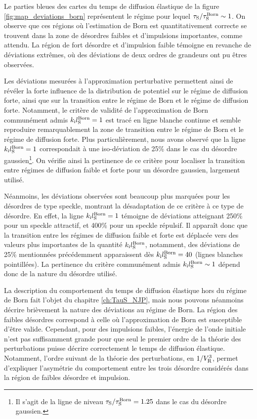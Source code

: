 Le parties bleues des cartes du temps de diffusion élastique de la figure \ref{fig:map_deviations_born} représentent le régime pour lequel $\tau_{\mathrm{S}}/\tau_{\mathrm{S}}^{\mathrm{Born}}\sim 1$. On observe que ces régions où l'estimation de Born est quantitativement correcte se trouvent dans la zone de désordres faibles et d'impulsions importantes, comme attendu. La région de fort désordre et d'impulsion faible témoigne en revanche de déviations extrêmes, où des déviations de deux ordres de grandeurs ont pu êtres observées.

Les déviations mesurées à l'approximation perturbative permettent ainsi de révéler la forte influence de la distribution de potentiel sur le régime de diffusion forte, ainsi que sur la transition entre le régime de Born et le régime de diffusion forte. Notamment, le critère de validité de l'approximation de Born communément admis $k_{\mathrm{i}}l_{\mathrm{S}}^{\mathrm{Born}}=1$ est tracé en ligne blanche continue et semble reproduire remarquablement la zone de transition entre le régime de Born et le régime de diffusion forte. Plus particulièrement, nous avons observé que la ligne $k_{\mathrm{i}}l_{\mathrm{S}}^{\mathrm{Born}}=1$ correspondait à une iso-déviation de 25\% dans le cas du désordre gaussien\footnote{Il s'agit de la ligne de niveau $\tau_{\mathrm{S}}/\tau_{\mathrm{S}}^{\mathrm{Born}}=1.25$ dans le cas du désordre gaussien.}. On vérifie ainsi la pertinence de ce critère pour localiser la transition entre régimes de diffusion faible et forte pour un désordre gaussien, largement utilisé.

Néanmoins, les déviations observées sont beaucoup plus marquées pour les désordres de type speckle, montrant la désadaptation de ce critère à ce type de désordre. En effet, la ligne $k_{\mathrm{i}}l_{\mathrm{S}}^{\mathrm{Born}}=1$ témoigne de déviations atteignant 250\% pour un speckle attractif, et 400\% pour un speckle répulsif. Il apparaît donc que la transition entre les régimes de diffusion faible et forte est déplacée vers des valeurs plus importantes de la quantité $k_{\mathrm{i}} l_{\mathrm{S}}^{\mathrm{Born}}$, notamment, des déviations de 25\% mentionnées précédemment apparaissent dès $k_{\mathrm{i}} l_{\mathrm{S}}^{\mathrm{Born}}=40$ (lignes blanches pointillées). La pertinence du critère communément admis $k_{\mathrm{i}} l_{\mathrm{S}}^{\mathrm{Born}}\sim 1$ dépend donc de la nature du désordre utilisé.

La description du comportement du temps de diffusion élastique hors du régime de Born fait l'objet du chapitre \ref{ch:TauS_NJP}, mais nous pouvons néanmoins décrire brièvement la nature des déviations au régime de Born. La région des faibles désordres correspond à celle où l'approximation de Born est susceptible d'être valide. Cependant, pour des impulsions faibles, l'énergie de l'onde initiale n'est pas suffisamment grande pour que seul le premier ordre de la théorie des perturbations puisse décrire correctement le temps de diffusion élastique. Notamment, l'ordre suivant de la théorie des perturbations, en $1/V_{\mathrm{R}}^3$, permet d'expliquer l'asymétrie du comportement entre les trois désordre considérés dans la région de faibles désordre et impulsion.

